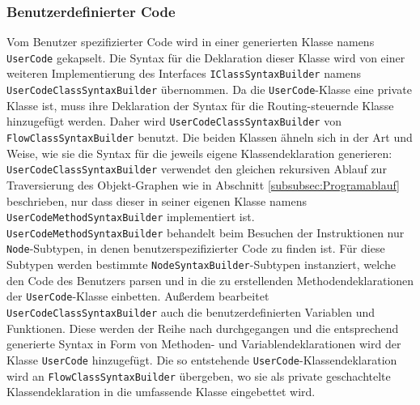 \subsubsection{Benutzerdefinierter Code}
Vom Benutzer spezifizierter Code wird in einer generierten Klasse namens \texttt{UserCode} gekapselt. Die Syntax für die Deklaration dieser Klasse wird von einer weiteren Implementierung des Interfaces \texttt{IClassSyntaxBuilder} namens \texttt{User\-Code\-Class\-Syn\-tax\-Buil\-der} übernommen. Da die \texttt{UserCode}-Klasse eine private Klasse ist, muss ihre Deklaration der Syntax für die Routing-steuernde Klasse hinzugefügt werden. Daher wird \texttt{UserCodeClassSyntaxBuilder} von \texttt{FlowClassSyntaxBuilder} benutzt. Die beiden Klassen ähneln sich in der Art und Weise, wie sie die Syntax für die jeweils eigene Klassendeklaration generieren: \texttt{UserCodeClassSyntaxBuilder} verwendet den gleichen rekursiven Ablauf zur Traversierung des Objekt-Graphen wie in Abschnitt \ref{subsubsec:Programablauf} beschrieben, nur dass dieser in seiner eigenen Klasse namens \texttt{UserCodeMethodSyntaxBuilder} implementiert ist. \texttt{User\-Code\-Meth\-od\-Syn\-tax\-Buil\-der} behandelt beim Besuchen der Instruktionen nur \texttt{Node}-Subtypen, in denen benutzerspezifizierter Code zu finden ist. Für diese Subtypen werden bestimmte \texttt{NodeSyntaxBuilder}-Subtypen instanziert, welche den Code des Benutzers parsen und in die zu erstellenden Methodendeklarationen der \texttt{UserCode}-Klasse einbetten. Außerdem bearbeitet \texttt{UserCodeClassSyntaxBuilder} auch die benutzerdefinierten Variablen und Funktionen. Diese werden der Reihe nach durchgegangen und die entsprechend generierte Syntax in Form von Methoden- und Variablendeklarationen wird der Klasse \texttt{UserCode} hinzugefügt. Die so entstehende \texttt{UserCode}-Klassendeklaration wird an \texttt{FlowClassSyntaxBuilder} übergeben, wo sie als private geschachtelte Klassendeklaration in die umfassende Klasse eingebettet wird.

